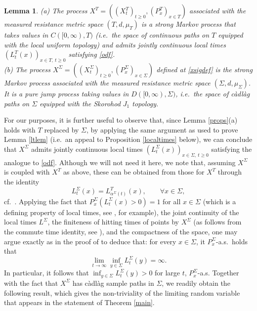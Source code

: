 \documentclass[a4paper, 11pt]{article}
\newtheorem{lem}[theorem]{Lemma}
\begin{document}
\begin{lem}
(a) The process $X^T=((X^T_t)_{t\geq 0},(P^T_x)_{x\in T})$ associated with the measured resistance metric space $(T,d,\mu_T)$ is a strong Markov process that takes values in $C([0,\infty),T)$ (i.e.\ the space of continuous paths on $T$ equipped with the local uniform topology) and admits jointly continuous local times $(L^T_t(x))_{x\in T,\:t\geq 0}$ satisfying \eqref{odf}.\\
(b) The process $X^\Sigma=((X^\Sigma_t)_{t\geq 0},(P^\Sigma_x)_{x\in \Sigma})$ defined at \eqref{xsigdef} is the strong Markov process associated with the measured resistance metric space $(\Sigma,d,\mu_\Sigma)$. It is a pure jump process taking values in $D([0,\infty),\Sigma)$, i.e.\ the space of c\`{a}dl\`{a}g paths on $\Sigma$ equipped with the Skorohod $J_1$ topology.
\end{lem}

For our purposes, it is further useful to observe that, since Lemma \ref{props}(a) holds with $T$ replaced by $\Sigma$, by applying the same argument as used to prove Lemma \ref{ltlem} (i.e.\ an appeal to Proposition \ref{localtimes} below), we can conclude that $X^\Sigma$ admits jointly continuous local times $(L^\Sigma_t(x))_{x\in \Sigma,\:t\geq 0}$ satisfying the analogue to \eqref{odf}. Although we will not need it here, we note that, assuming $X^\Sigma$ is coupled with $X^T$ as above, these can be obtained from those for $X^T$ through the identity
\begin{equation}\label{ltequiv}
L^\Sigma_t(x)=L^T_{\alpha^\Sigma(t)}(x),\qquad \forall x\in \Sigma,
\end{equation}
cf.\ \cite[Lemma 3.4]{Cr1}. Applying the fact that $P_x^\Sigma(L_t^\Sigma(x)>0)=1$ for all $x\in \Sigma$ (which is a defining property of local times, see \cite[Definition 4.10]{Noda}, for example), the joint continuity of the local times $L^\Sigma$, the finiteness of hitting times of points by $X^\Sigma$ (as follows from the commute time identity, see \cite[(2.17)]{CHK}), and the compactness of the space, one may argue exactly as in the proof of \cite[Lemma 2.3]{Cr2} to deduce that: for every $x\in \Sigma$, it $P_x^\Sigma$-a.s.\ holds that
\begin{equation}\label{ltdiv}
\lim_{t\rightarrow\infty}\inf_{y\in \Sigma}L^\Sigma_t(y)=\infty.
\end{equation}
In particular, it follows that $\inf_{y\in \Sigma}L^\Sigma_t(y)>0$ for large $t$, $P_x^\Sigma$-a.s. Together with the fact that $X^\Sigma$ has c\`{a}dl\`{a}g sample paths in $\Sigma$, we readily obtain the following result, which gives the non-triviality of the limiting random variable that appears in the statement of Theorem \ref{main}.
\end{document}
